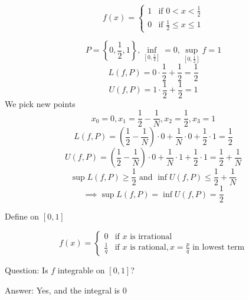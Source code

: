 \begin{example*}
\[
  f(x) = \begin{cases}
    1 & \text{if } 0 < x < \frac{1}{2}\\
    0 & \text{if } \frac{1}{2} \leq x \leq 1
    \end{cases}
\] 

$$P = \left\{0, \frac{1}{2}, 1\right\}, \inf_{[0, \frac{1}{2}]} = 0, \sup_{[0, \frac{1}{2}]} f = 1$$
$$L(f, P) = 0\cdot\frac{1}{2} + \frac{1}{2} = \frac{1}{2}$$
$$U(f, P) = 1\cdot\frac{1}{2} + \frac{1}{2} = 1$$
We pick new points
$$x_0 = 0, x_1 = \frac{1}{2} - \frac{1}{N}, x_2 = \frac{1}{2}, x_3 = 1$$
$$L(f, P) = \left(\frac{1}{2} - \frac{1}{N}\right)\cdot 0 + \frac{1}{N}\cdot 0 + \frac{1}{2}\cdot 1 = \frac{1}{2}$$
$$U(f, P) = \left(\frac{1}{2} - \frac{1}{N}\right)\cdot 0 + \frac{1}{N}\cdot 1 + \frac{1}{2}\cdot 1 = \frac{1}{2} + \frac{1}{N}$$
$$\sup L(f, P) \ge \frac{1}{2}\text{ and } \inf U(f, P) \le \frac{1}{2} + \frac{1}{N}$$
$$\implies \sup L(f, P) = \inf U(f, P) = \frac{1}{2}$$
\end{example*}

\begin{example*}
  Define on $[0, 1]$

\[
  f(x) = \begin{cases}
    0 & \text{if } x \text{ is irrational}\\
    \frac{1}{q} & \text{if } x \text{ is rational}, x = \frac{p}{q}\text{ in lowest term}
    \end{cases}
\]

Question: Is $f$ integrable on $[0, 1]$?

Answer: Yes, and the integral is $0$
\end{example*}

